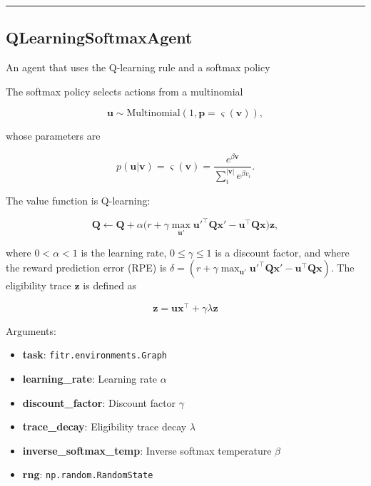 \begin{center}\rule{0.5\linewidth}{\linethickness}\end{center}

\subsection{QLearningSoftmaxAgent}\label{qlearningsoftmaxagent}

\begin{Shaded}
\begin{Highlighting}[]
\end{Highlighting}
\end{Shaded}

An agent that uses the Q-learning rule and a softmax policy

The softmax policy selects actions from a multinomial

\[
\mathbf u \sim \mathrm{Multinomial}(1, \mathbf p=\varsigma(\mathbf v)),
\]

whose parameters are

\[
p(\mathbf u|\mathbf v) = \varsigma(\mathbf v) = \frac{e^{\beta \mathbf v}}{\sum_{i}^{|\mathbf v|} e^{\beta v_i}}.
\]

The value function is Q-learning:

\[
\mathbf Q \gets \mathbf Q + \alpha \big(r + \gamma \max_{\mathbf u'} \mathbf u'^\top \mathbf Q \mathbf x' - \mathbf u^\top \mathbf Q \mathbf x \big) \mathbf z,
\]

where \(0 < \alpha < 1\) is the learning rate, \(0 \leq \gamma \leq 1\)
is a discount factor, and where the reward prediction error (RPE) is
\(\delta = (r + \gamma \max_{\mathbf u'} \mathbf u'^\top \mathbf Q \mathbf x' - \mathbf u^\top \mathbf Q \mathbf x)\).
The eligibility trace \(\mathbf z\) is defined as

\[
\mathbf z = \mathbf u \mathbf x^\top +  \gamma \lambda \mathbf z
\]

Arguments:

\begin{itemize}
\tightlist
\item
  \textbf{task}: \texttt{fitr.environments.Graph}
\item
  \textbf{learning\_rate}: Learning rate \(\alpha\)
\item
  \textbf{discount\_factor}: Discount factor \(\gamma\)
\item
  \textbf{trace\_decay}: Eligibility trace decay \(\lambda\)
\item
  \textbf{inverse\_softmax\_temp}: Inverse softmax temperature \(\beta\)
\item
  \textbf{rng}: \texttt{np.random.RandomState}
\end{itemize}

